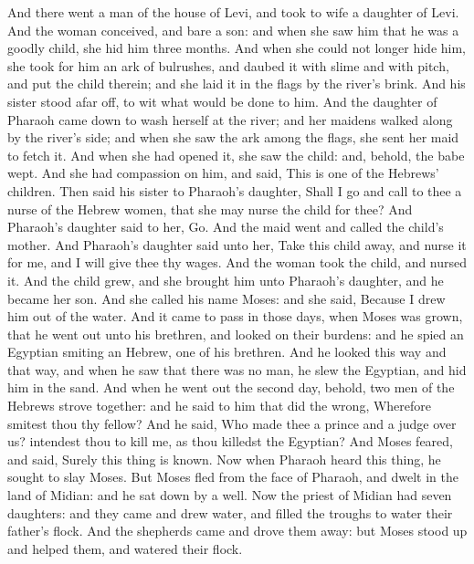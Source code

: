 \begin{biblechapter} %
 And there went a man of the house of Levi, and took to wife a daughter of Levi.
\verse And the woman conceived, and bare a son: and when she saw him that he was a goodly child, she hid him three months.
\verse And when she could not longer hide him, she took for him an ark of bulrushes, and daubed it with slime and with pitch, and put the child therein; and she laid it in the flags by the river's brink.
\verse And his sister stood afar off, to wit what would be done to him.
\verse And the daughter of Pharaoh came down to wash herself at the river; and her maidens walked along by the river's side; and when she saw the ark among the flags, she sent her maid to fetch it.
\verse And when she had opened it, she saw the child: and, behold, the babe wept. And she had compassion on him, and said, This is one of the Hebrews' children.
\verse Then said his sister to Pharaoh's daughter, Shall I go and call to thee a nurse of the Hebrew women, that she may nurse the child for thee?
\verse And Pharaoh's daughter said to her, Go. And the maid went and called the child's mother.
\verse And Pharaoh's daughter said unto her, Take this child away, and nurse it for me, and I will give thee thy wages. And the woman took the child, and nursed it.
\verse And the child grew, and she brought him unto Pharaoh's daughter, and he became her son. And she called his name Moses: and she said, Because I drew him out of the water.
 And it came to pass in those days, when Moses was grown, that he went out unto his brethren, and looked on their burdens: and he spied an Egyptian smiting an Hebrew, one of his brethren.
\verse And he looked this way and that way, and when he saw that there was no man, he slew the Egyptian, and hid him in the sand.
\verse And when he went out the second day, behold, two men of the Hebrews strove together: and he said to him that did the wrong, Wherefore smitest thou thy fellow?
\verse And he said, Who made thee a prince and a judge over us? intendest thou to kill me, as thou killedst the Egyptian? And Moses feared, and said, Surely this thing is known.
\verse Now when Pharaoh heard this thing, he sought to slay Moses. But Moses fled from the face of Pharaoh, and dwelt in the land of Midian: and he sat down by a well.
\verse Now the priest of Midian had seven daughters: and they came and drew water, and filled the troughs to water their father's flock.
\verse And the shepherds came and drove them away: but Moses stood up and helped them, and watered their flock.

\end{biblechapter}
